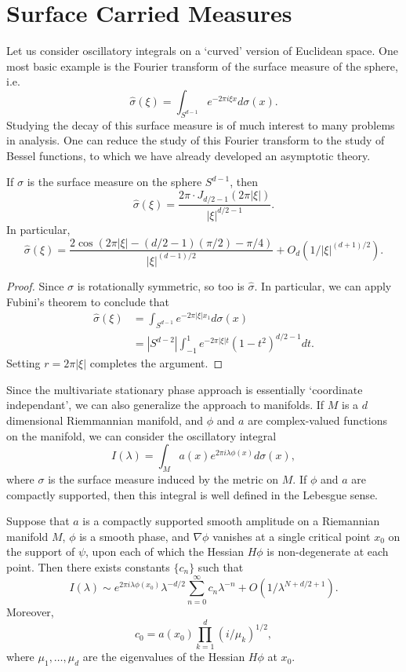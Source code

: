 \section{Surface Carried Measures}

Let us consider oscillatory integrals on a `curved' version of Euclidean space. One most basic example is the Fourier transform of the surface measure of the sphere, i.e.
%
\[ \widehat{\sigma}(\xi) = \int_{S^{d-1}} e^{-2 \pi i \xi x} d\sigma(x). \]
%
Studying the decay of this surface measure is of much interest to many problems in analysis. One can reduce the study of this Fourier transform to the study of Bessel functions, to which we have already developed an asymptotic theory.

\begin{theorem}
  If $\sigma$ is the surface measure on the sphere $S^{d-1}$, then
  \[ \widehat{\sigma}(\xi) = \frac{2\pi \cdot J_{d/2 - 1}(2 \pi |\xi|)}{|\xi|^{d/2 - 1}}. \]
  In particular,
  \[ \widehat{\sigma}(\xi) = \frac{2 \cos(2\pi |\xi| - (d/2 - 1)(\pi/2) - \pi/4)}{|\xi|^{(d-1)/2}} + O_d(1/|\xi|^{(d+1)/2}). \]
\end{theorem}
\begin{proof}
  Since $\sigma$ is rotationally symmetric, so too is $\widehat{\sigma}$. In particular, we can apply Fubini's theorem to conclude that
  \begin{align*}
    \widehat{\sigma}(\xi) &= \int_{S^{d-1}} e^{-2 \pi |\xi| x_1} d\sigma(x)\\
    &= |S^{d-2}| \int_{-1}^1 e^{-2 \pi |\xi| t} (1 - t^2)^{d/2-1} dt.
  \end{align*}
  Setting $r = 2 \pi |\xi|$ completes the argument.
\end{proof}

Since the multivariate stationary phase approach is essentially `coordinate independant', we can also generalize the approach to manifolds. If $M$ is a $d$ dimensional Riemmannian manifold, and $\phi$ and $a$ are complex-valued functions on the manifold, we can consider the oscillatory integral
%
\[ I(\lambda) = \int_M a(x) e^{2 \pi i \lambda \phi(x)} d\sigma(x), \]
%
where $\sigma$ is the surface measure induced by the metric on $M$. If $\phi$ and $a$ are compactly supported, then this integral is well defined in the Lebesgue sense.

\begin{theorem}
  Suppose that $a$ is a compactly supported smooth amplitude on a Riemannian manifold $M$, $\phi$ is a smooth phase, and $\nabla \phi$ vanishes at a single critical point $x_0$ on the support of $\psi$, upon each of which the Hessian $H\phi$ is non-degenerate at each point. Then there exists constants $\{ c_n \}$ such that
  \[ I(\lambda) \sim e^{2 \pi i \lambda \phi(x_0)} \lambda^{-d/2} \sum_{n = 0}^\infty c_n \lambda^{-n} + O(1/\lambda^{N + d/2 + 1}). \]
  Moreover,
  \[ c_0 = a(x_0) \prod_{k = 1}^d (i/\mu_k)^{1/2}, \]
  where $\mu_1, \dots, \mu_d$ are the eigenvalues of the Hessian $H\phi$ at $x_0$.
\end{theorem}



